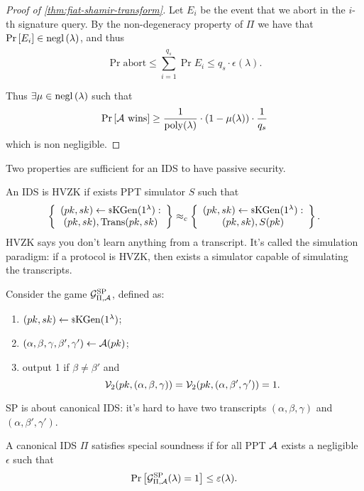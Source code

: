 \begin{proof}[Proof of \cref{thm:fiat-shamir-transform}]
	Let $E_i$ be the event that we abort in the $i$-th signature query.
	By the non-degeneracy property of $\Pi$ we have that $\mathop{\mathrm{Pr}}\limits_{} \left[ {E_i} \right] \in \mathrm{negl}\left({\lambda}\right)$, and thus
	\begin{equation*} 
		\Pr{\text{abort}} \le \sum_{i=1}^{q_s} \Pr{E_i} \le q_s \cdot \epsilon(\lambda).
	\end{equation*}

	Thus $\exists \mu \in \mathrm{negl}\left({\lambda}\right)$ such that
	\begin{equation*}
		\mathop{\mathrm{Pr}}\limits_{} \left[ {\text{$\mathcal{A}$ wins}} \right] \ge \frac{1}{\mathrm{poly}(\lambda)} \cdot (1 - \mu(\lambda)) \cdot \frac{1}{q_s}
	\end{equation*}
	which is non negligible.
\end{proof}

Two properties are sufficient for an \ac{IDS} to have passive security.

\begin{definition}
	An \ac{IDS} is \ac{HVZK} if exists \ac{PPT} simulator $S$ such that
	\begin{equation*}
		\left\{
			\begin{array}{c}
			(pk, sk) \leftarrow {\scriptstyle \$} {\mathrm{KGen}(1^{\lambda})} : \\
			(pk, sk), \mathrm{Trans}(pk, sk)
			\end{array}
		\right\}
		\approx_c
		\left\{
			\begin{array}{c}
			(pk, sk) \leftarrow {\scriptstyle \$} {\mathrm{KGen}(1^{\lambda})} : \\
			(pk, sk), S(pk)
			\end{array}
		\right\}.
	\end{equation*}
	\ac{HVZK} says you don't learn anything from a transcript.
	It's called the simulation paradigm: if a protocol is \ac{HVZK}, then exists a simulator capable of simulating the transcripts.
\end{definition}

\begin{definition}[\acl{SP}]
	Consider the game $\mathcal{G}^{\mathrm{SP}}_{\Pi, \mathcal{A}}$, defined as:
	\begin{enumerate}
		\item $(pk, sk) \leftarrow {\scriptstyle \$} {\mathrm{KGen}(1^{\lambda})}$;
		\item $(\alpha, \beta, \gamma, \beta', \gamma') \leftarrow \mathcal{A}(pk)$;
		\item output 1 if $\beta \neq \beta'$ and
			\begin{equation*}
				\mathcal{V}_2(pk, (\alpha, \beta, \gamma)) = \mathcal{V}_2(pk, (\alpha, \beta', \gamma')) = 1.
			\end{equation*}
	\end{enumerate}
	\ac{SP} is about canonical \ac{IDS}: it's hard to have two transcripts $(\alpha, \beta, \gamma)$ and $(\alpha, \beta', \gamma')$.

	A canonical \ac{IDS} $\Pi$ satisfies special soundness if for all \ac{PPT} $\mathcal{A}$ exists a negligible $\epsilon$ such that
	\begin{equation*}
		\mathop{\mathrm{Pr}}\limits_{} \left[ {\mathcal{G}^{\mathrm{SP}}_{\Pi, \mathcal{A}}(\lambda) = 1} \right] \le \varepsilon(\lambda). \qedhere
	\end{equation*}
\end{definition}

